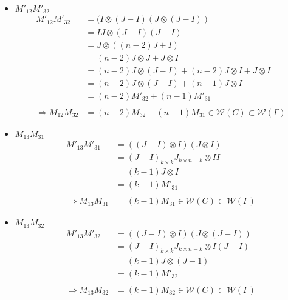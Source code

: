 \documentclass{article}
\begin{document}
\begin{itemize}
\begin{itemize}
\begin{itemize}
            \item $M'_{12}M'_{32}$ \\
            \begin{align*}
                M'_{12}M'_{32}
                &= (I\otimes(J-I)(J\otimes (J-I)) \\
                &= IJ\otimes(J-I)(J-I) \\
                &= J\otimes((n-2)J + I)\\
                &= (n-2)J\otimes J + J\otimes I\\
                &= (n-2)J\otimes(J-I) +(n-2)J\otimes I + J\otimes I\\
                &= (n-2)J\otimes(J-I) +(n-1)J\otimes I \\
                &= (n-2)M'_{32} +(n-1)M'_{31}\\ \\
                \Rightarrow M_{12}M_{32} &= (n-2)M_{32} +(n-1)M_{31} \in \mathcal{W}(C) \subset \mathcal{W}(\Gamma)
            \end{align*}

            \item $M_{13}M_{31}$ \\
            \begin{align*}
                M'_{13}M'_{31}
                &= ((J-I)\otimes I)(J\otimes I) \\
                &= (J-I)_{k\times k}J_{k\times n-k}\otimes II \\
                &= (k-1)J\otimes I\\
                &= (k-1)M'_{31} \\ \\
                \Rightarrow M_{13}M_{31} &= (k-1)M_{31} \in \mathcal{W}(C) \subset \mathcal{W}(\Gamma)
            \end{align*}

            \item $M_{13}M_{32}$ \\
            \begin{align*}
                M'_{13}M'_{32}
                &= ((J-I)\otimes I)(J\otimes (J-I)) \\
                &= (J-I)_{k\times k}J_{k\times n-k}\otimes I(J-I) \\
                &= (k-1)J\otimes (J-1)\\
                &= (k-1)M'_{32} \\ \\
                \Rightarrow M_{13}M_{32} &= (k-1)M_{32} \in \mathcal{W}(C) \subset \mathcal{W}(\Gamma)
            \end{align*}


\end{itemize}
\end{itemize}
\end{itemize}
\end{document}
